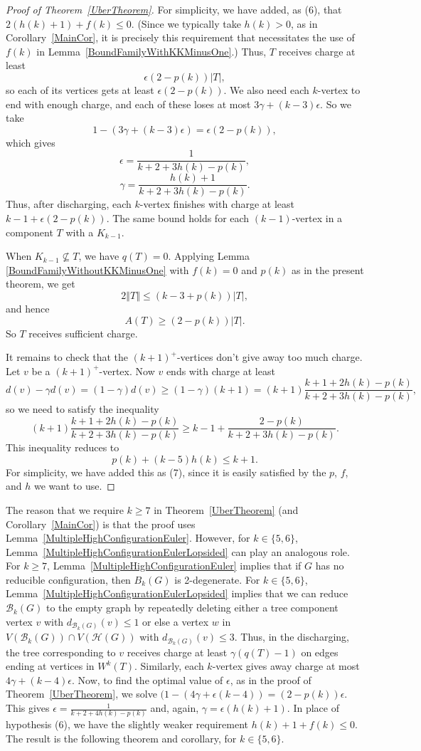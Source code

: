 \documentclass[12pt]{article}
\theoremstyle{plain}
\theoremstyle{definition}
\theoremstyle{remark}
\newcommand{\fancy}[1]{\mathcal{#1}}
\newcommand{\B}{\fancy{B}}
\newcommand{\HH}{\fancy{H}}
\newcommand{\card}[1]{\left|#1\right|}
\newcommand{\size}[1]{\left\Vert#1\right\Vert}
\newcommand{\parens}[1]{\left( #1 \right)}
\begin{document}
\begin{proof}[Proof of Theorem~\ref{UberTheorem}]
%
For simplicity, we have added, as (6), that $2(h(k) + 1) + f(k) \le 0$.  (Since we typically take $h(k) > 0$, as in Corollary~\ref{MainCor}, it is precisely this requirement that necessitates the use of $f(k)$ in Lemma~\ref{BoundFamilyWithKKMinusOne}.)  Thus, $T$ receives charge at least
\[\epsilon\parens{2-p(k)}\card{T},\]
so each of its vertices gets at least $\epsilon(2-p(k))$.
We also need each $k$-vertex to end with enough charge, and each of these loses at most $3\gamma+(k-3)\epsilon$.  So we take
\[1 - (3\gamma + (k-3)\epsilon) = \epsilon\parens{2-p(k)},\]
which gives
\[\epsilon = \frac{1}{k+2 + 3h(k) - p(k)},\]
\[\gamma = \frac{h(k)+1}{k+2 + 3h(k) - p(k)}.\]
Thus, after discharging, each $k$-vertex finishes with charge at least $k-1+\epsilon(2-p(k))$.  The same bound holds for each $(k-1)$-vertex in a component $T$ with a $K_{k-1}$.

When $K_{k-1} \not \subseteq T$, we have $q(T) = 0$.  Applying Lemma
\ref{BoundFamilyWithoutKKMinusOne} with $f(k) = 0$ and $p(k)$ as in the present
theorem, we get 
\[2\size{T} \le (k-3 + p(k))\card{T},\]
and hence
\[A(T) \ge (2-p(k))\card{T}.\]
So $T$ receives sufficient charge.

It remains to check that the $(k+1)^+$-vertices don't give away too much
charge.  Let $v$ be a $(k+1)^+$-vertex. Now $v$ ends with charge at least
%
\[d(v) - \gamma d(v) = (1-\gamma)d(v) \ge (1-\gamma)(k+1) = (k+1)\frac{k+1 +
2h(k) - p(k)}{k+2 + 3h(k) - p(k)},\]
%
so we need to satisfy the inequality
%
\[(k+1)\frac{k+1 + 2h(k) - p(k)}{k+2 + 3h(k) - p(k)} \ge k-1 +
\frac{2-p(k)}{k+2 + 3h(k) - p(k)}.\]
%
This inequality reduces to
%
\[p(k) + (k-5)h(k) \le k+1.\]
%
For simplicity, we have added this as (7), since it is easily satisfied by the
$p$, $f$, and $h$ we want to use.
\end{proof}

The reason that we require $k\ge 7$ in Theorem~\ref{UberTheorem} (and
Corollary~\ref{MainCor}) is that the proof uses
Lemma~\ref{MultipleHighConfigurationEuler}.  However, for $k\in\{5,6\}$,
Lemma~\ref{MultipleHighConfigurationEulerLopsided} can play an analogous role. 
For $k\ge 7$, Lemma~\ref{MultipleHighConfigurationEuler} implies that if $G$
has no reducible configuration, then $B_k(G)$ is 2-degenerate.  For
$k\in\{5,6\}$, Lemma~\ref{MultipleHighConfigurationEulerLopsided} implies that
we can reduce $\B_k(G)$ to the empty graph by repeatedly deleting either a tree
component vertex $v$ with $d_{\B_k(G)}(v)\le 1$ or else a vertex $w$ in
$V(\B_k(G))\cap V(\HH(G))$ with $d_{\B_k(G)}(v)\le 3$.  Thus, in the
discharging, the tree corresponding to $v$ receives charge at least
$\gamma(q(T)-1)$ on edges ending at vertices in $W^k(T)$.  Similarly, each
$k$-vertex gives away charge at most $4\gamma+(k-4)\epsilon$.  Now, to find the
optimal value of $\epsilon$, as in the proof of Theorem~\ref{UberTheorem}, we
solve $(1-(4\gamma+\epsilon(k-4))=(2-p(k))\epsilon$.  This gives $\epsilon =
\frac1{k+2+4h(k)-p(k)}$ and, again, $\gamma=\epsilon(h(k)+1)$.  In place of
hypothesis (6), we have the slightly weaker requirement $h(k)+1+f(k)\le 0$. 
The result is the following theorem and corollary, for $k\in\{5,6\}$.
\end{document}
